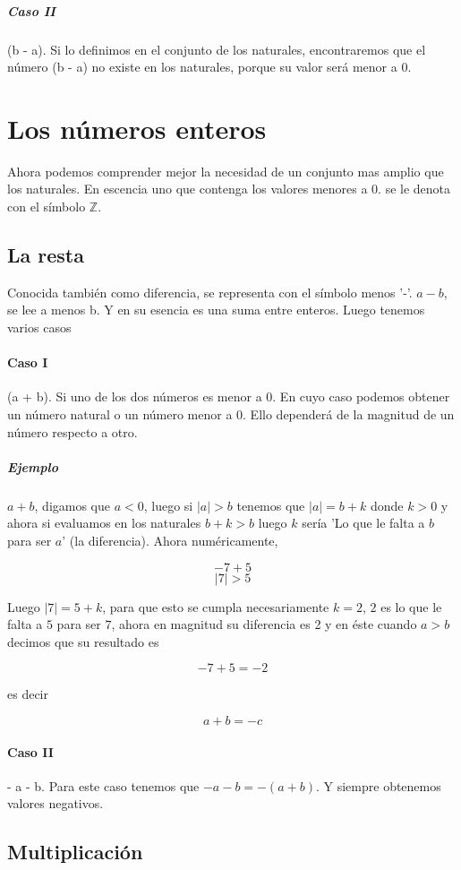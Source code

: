 \documentclass{article}
\begin{document}
\subparagraph{Caso II} (b - a). Si lo definimos en el conjunto de los naturales, encontraremos que el número (b - a) no existe en los naturales, porque su valor será menor a 0.

\section{Los números enteros}

Ahora podemos comprender mejor la necesidad de un conjunto mas amplio que los naturales. En escencia uno que contenga los valores menores a 0. se le denota con el símbolo $\mathbb{Z}$.

\subsection{La resta}

Conocida también como diferencia, se representa con el símbolo menos '-'. $a - b$, se lee a menos b. Y en su esencia es una suma entre enteros. Luego tenemos varios casos

\paragraph{Caso I} (a + b). Si uno de los dos números es menor a 0. En cuyo caso podemos obtener un número natural o un número menor a 0. Ello dependerá de la magnitud de un número respecto a otro.

\subparagraph{Ejemplo} $a + b$, digamos que $a < 0$, luego si $|a| > b$ tenemos que $|a| = b + k$ donde $k>0$ y ahora si evaluamos en los naturales $b + k > b$ luego $k$ sería 'Lo que le falta a $b$ para ser $a$' (la diferencia). Ahora numéricamente, 

$$-7 + 5$$
$$|7| > 5$$

Luego $|7| = 5 + k$, para que esto se cumpla necesariamente $k = 2$, $2$ es lo que le falta a $5$ para ser $7$, ahora en magnitud su diferencia es 2 y en éste cuando $a>b$ decimos que su resultado es 

$$-7 + 5 = -2$$

es decir

$$a + b = -c$$

\paragraph{Caso II} - a - b. Para este caso tenemos que $-a - b = -(a+b)$. Y siempre obtenemos valores negativos.

\subsection{Multiplicación}
\end{document}

